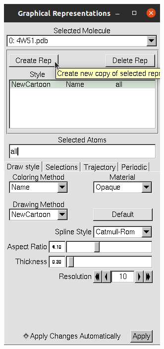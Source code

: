     \begin{figure}[H]
        \centering
        \begin{minipage}{0.5\textwidth}
            \centering
            \includegraphics[height=0.4\textheight]{Graphics/ScreenShots/NewRep.png}
            \label{fig:NewRep}
        \end{minipage}%
        \begin{minipage}{0.5\textwidth}
            \centering

\end{minipage}
\end{figure}
